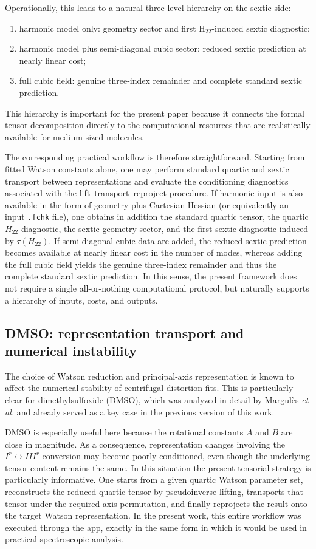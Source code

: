 Operationally, this leads to a natural three-level hierarchy on the sextic
side:
\begin{enumerate}
\item harmonic model only: geometry sector and first H$_{22}$-induced sextic
diagnostic;
\item harmonic model plus semi-diagonal cubic sector: reduced sextic
prediction at nearly linear cost;
\item full cubic field: genuine three-index remainder and complete standard
sextic prediction.
\end{enumerate}
This hierarchy is important for the present paper because it connects the
formal tensor decomposition directly to the computational resources that are
realistically available for medium-sized molecules.

The corresponding practical workflow is therefore straightforward.
Starting from fitted Watson constants alone, one may perform standard
quartic and sextic transport between representations and evaluate the
conditioning diagnostics associated with the lift--transport--reproject
procedure. If harmonic input is also available in the form of geometry
plus Cartesian Hessian (or equivalently an input \texttt{.fchk} file),
one obtains in addition the standard quartic tensor, the quartic
$H_{22}$ diagnostic, the sextic geometry sector, and the first sextic
diagnostic induced by $\tau(H_{22})$. If semi-diagonal cubic data are
added, the reduced sextic prediction becomes available at nearly linear
cost in the number of modes, whereas adding the full cubic field yields
the genuine three-index remainder and thus the complete standard sextic
prediction. In this sense, the present framework does not require a
single all-or-nothing computational protocol, but naturally supports a
hierarchy of inputs, costs, and outputs.

\subsection{DMSO: representation transport and numerical instability}

The choice of Watson reduction and principal-axis representation is known to
affect the numerical stability of centrifugal-distortion fits. This is
particularly clear for dimethylsulfoxide (DMSO), which was analyzed in detail
by Margul\`es \emph{et al.}\cite{Margules2010} and already served as a key case
in the previous version of this work.

DMSO is especially useful here because the rotational constants $A$ and $B$
are close in magnitude. As a consequence, representation changes involving the
$I^r \leftrightarrow III^r$ conversion may become poorly conditioned, even
though the underlying tensor content remains the same. In this situation the
present tensorial strategy is particularly informative. One starts from a
given quartic Watson parameter set, reconstructs the reduced quartic tensor by
pseudoinverse lifting, transports that tensor under the required axis
permutation, and finally reprojects the result onto the target Watson
representation. In the present work, this entire workflow was executed through
the app, exactly in the same form in which it would be used in practical
spectroscopic analysis.

